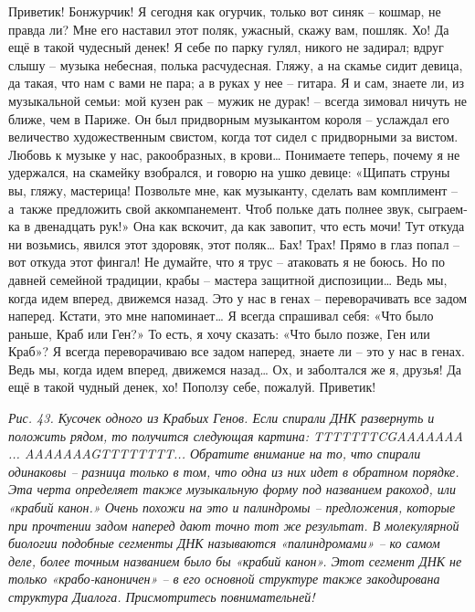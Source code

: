 \documentclass[../main.tex]{subfiles}
\begin{document}
\begin{dialogue}
 Приветик! Бонжурчик! Я сегодня как огурчик, только вот синяк \--- кошмар, не правда ли? Мне его наставил этот поляк, ужасный, скажу вам, пошляк. Хо! Да ещё в такой чудесный денек! Я себе по парку гулял, никого не задирал; вдруг слышу \--- музыка небесная, полька расчудесная. Гляжу, а на скамье сидит девица, да такая, что нам с вами не пара; а в руках у нее \--- гитара. Я и сам, знаете ли, из музыкальной семьи: мой кузен рак \--- мужик не дурак! \--- всегда зимовал ничуть не ближе, чем в Париже. Он был придворным музыкантом короля \--- услаждал его величество художественным свистом, когда тот сидел с придворными за вистом. Любовь к музыке у нас, ракообразных, в крови\ldots{} Понимаете теперь, почему я не удержался, на скамейку взобрался, и говорю на ушко девице: «Щипать струны вы, гляжу, мастерица! Позвольте мне, как музыканту, сделать вам комплимент \--- а~также предложить свой аккомпанемент. Чтоб польке дать полнее звук, сыграем-ка в двенадцать рук!» Она как вскочит, да как завопит, что есть мочи! Тут откуда ни возьмись, явился этот здоровяк, этот поляк\ldots{} Бах! Трах! Прямо в глаз попал \--- вот откуда этот фингал! Не думайте, что я трус \--- атаковать я не боюсь. Но по давней семейной традиции, крабы \--- мастера защитной диспозиции\ldots{} Ведь мы, когда идем вперед, движемся назад. Это у нас в генах \--- переворачивать все задом наперед. Кстати, это мне напоминает\ldots{} Я всегда спрашивал себя: «Что было раньше, Краб или Ген?» То есть, я хочу сказать: «Что было позже, Ген или Краб»? Я всегда переворачиваю все задом наперед, знаете ли \--- это у нас в генах. Ведь мы, когда идем вперед, движемся назад\ldots{} Ох, и заболтался же я, друзья! Да ещё в такой чудный денек, хо! Поползу себе, пожалуй. Приветик!


\emph{Рис. 43. Кусочек одного из Крабьих Генов. Если спирали ДНК развернуть и положить рядом, то получится следующая картина: TTTTTTTCGAAAAAAA ... AAAAAAAGTTTTTTTT... Обратите внимание на то, что спирали одинаковы \--- разница только в том, что одна из них идет в обратном порядке. Эта черта определяет также музыкальную форму под названием ракоход, или «крабий канон.» Очень похожи на это и палиндромы \--- предложения, которые при прочтении задом наперед дают точно тот же результат. В молекулярной биологии подобные сегменты ДНК называются «палиндромами» \--- ко самом деле, более точным названием было бы «крабий канон». Этот сегмент ДНК не только «крабо-каноничен» \--- в его основной структуре также закодирована структура Диалога. Присмотритесь повнимательней!}


\end{dialogue}
\end{document}
